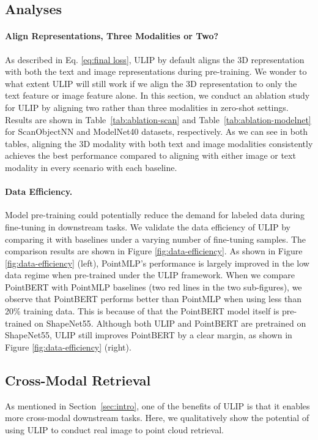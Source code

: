 \documentclass[10pt,twocolumn,letterpaper]{article}
\begin{document}
\subsection{Analyses}
\label{sec:more analyses}

\paragraph{Align Representations, Three Modalities or Two?}
As described in Eq. \ref{eq:final loss}, ULIP by default aligns the 3D representation with both the text and image representations during pre-training.
We wonder to what extent ULIP will still work if we align the 3D representation to only the text feature or image feature alone.
In this section,
we conduct an ablation study for ULIP by aligning two rather than three modalities in zero-shot settings.
Results are shown in Table~\ref{tab:ablation-scan} and Table~\ref{tab:ablation-modelnet} for ScanObjectNN and ModelNet40 datasets, respectively. As we can see in both tables, aligning the 3D modality with both text and image modalities consistently achieves the best performance compared to aligning with either image or text modality in every scenario with each baseline.

\vspace{-10pt}
\paragraph{Data Efficiency.}
Model pre-training could potentially reduce the demand for labeled data during fine-tuning in downstream tasks. We validate the data efficiency of ULIP by comparing it with baselines under a varying number of fine-tuning samples. The comparison results are shown in Figure \ref{fig:data-efficiency}. As shown in Figure \ref{fig:data-efficiency} (left), PointMLP's performance is largely improved in the low data regime when pre-trained under the ULIP framework. When we compare PointBERT with PointMLP baselines (two red lines in the two sub-figures), we observe that PointBERT performs better than PointMLP when using less than 20\% training data. This is because of that the PointBERT model itself is pre-trained on ShapeNet55. Although both ULIP and PointBERT are pretrained on ShapeNet55, ULIP still improves PointBERT by a clear margin, as shown in Figure \ref{fig:data-efficiency} (right).








\subsection{Cross-Modal Retrieval}
As mentioned in Section~\ref{sec:intro}, one of the benefits of ULIP is that it enables more cross-modal downstream tasks. Here, we qualitatively show the potential of using ULIP to conduct real image to point cloud retrieval. 
\end{document}
